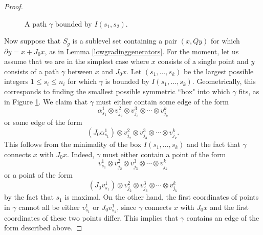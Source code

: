 \documentclass[11 pt]{amsart}
\theoremstyle{remark}
\begin{document}
\begin{proof}
\begin{figure}[h!]
\caption{A path $\gamma$ bounded by $I(s_1, s_2)$.}
\label{boundedpath}
\end{figure}

Now suppose that $S_g$ is a sublevel set containing a pair $(x, Qy)$ for which $\partial y = x + J_0x$, as in Lemma \ref{lowgradinggenerators}. For the moment, let us assume that we are in the simplest case where $x$ consists of a single point and $y$ consists of a path $\gamma$ between $x$ and $J_0x$. Let $(s_1, \ldots, s_k)$ be the largest possible integers $1 \leq s_i \leq n_i$ for which $\gamma$ is bounded by $I(s_1, \ldots, s_k)$. Geometrically, this corresponds to finding the smallest possible symmetric ``box" into which $\gamma$ fits, as in Figure \ref{boundedpath}. We claim that $\gamma$ must either contain some edge of the form
\[
\alpha^1_{s_1} \otimes v^2_{j_2} \otimes v^3_{j_3} \otimes \cdots \otimes v^k_{j_k}
\]
or some edge of the form
\[
(J_0\alpha^1_{s_1}) \otimes v^2_{j_2} \otimes v^3_{j_3} \otimes \cdots \otimes v^k_{j_k}.
\]
This follows from the minimality of the box $I(s_1, \ldots, s_k)$ and the fact that $\gamma$ connects $x$ with $J_0x$. Indeed, $\gamma$ must either contain a point of the form 
\[
v^1_{s_1} \otimes v^2_{j_2} \otimes v^3_{j_3} \otimes \cdots \otimes v^k_{j_k}
\]
or a point of the form
\[
(J_0v^1_{s_1}) \otimes v^2_{j_2} \otimes v^3_{j_3} \otimes \cdots \otimes v^k_{j_k}
\]
by the fact that $s_1$ is maximal. On the other hand, the first coordinates of points in $\gamma$ cannot all be either $v^1_{s_1}$ or $J_0v^1_{s_1}$, since $\gamma$ connects $x$ with $J_0x$ and the first coordinates of these two points differ. This implies that $\gamma$ contains an edge of the form described above. 


\end{proof}
\end{document}
